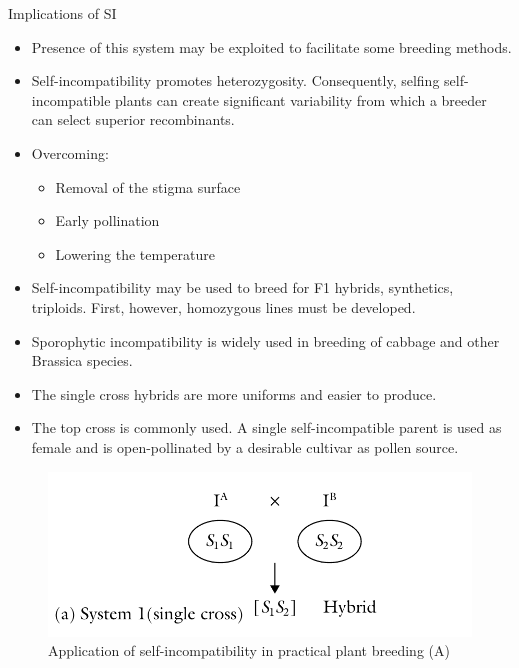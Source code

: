 \documentclass[11pt,ignorenonframetext,aspectratio=169]{beamer}
\providecommand{\tightlist}{%
  \setlength{\itemsep}{0pt}\setlength{\parskip}{0pt}}
\begin{document}
\begin{frame}{Implications of SI}
\protect\hypertarget{implications-of-si}{}
\begin{itemize}
\tightlist
\item
  Presence of this system may be exploited to facilitate some breeding
  methods.
\item
  Self-incompatibility promotes heterozygosity. Consequently, selfing
  self-incompatible plants can create significant variability from which
  a breeder can select superior recombinants.
\item
  Overcoming:

  \begin{itemize}
  \tightlist
  \item
    Removal of the stigma surface
  \item
    Early pollination
  \item
    Lowering the temperature
  \end{itemize}
\item
  Self-incompatibility may be used to breed for F1 hybrids, synthetics,
  triploids. First, however, homozygous lines must be developed.
\item
  Sporophytic incompatibility is widely used in breeding of cabbage and
  other Brassica species.
\item
  The single cross hybrids are more uniforms and easier to produce.
\item
  The top cross is commonly used. A single self-incompatible parent is
  used as female and is open-pollinated by a desirable cultivar as
  pollen source.
\end{itemize}
\end{frame}

\begin{frame}{}
\protect\hypertarget{section-8}{}
\begin{figure}

{\centering \includegraphics[width=0.5\linewidth]{./images/incompatibility_use_SC} 

}

\caption{Application of self-incompatibility in practical plant breeding (A)}\label{fig:si-use-sc}
\end{figure}
\end{frame}
\end{document}
